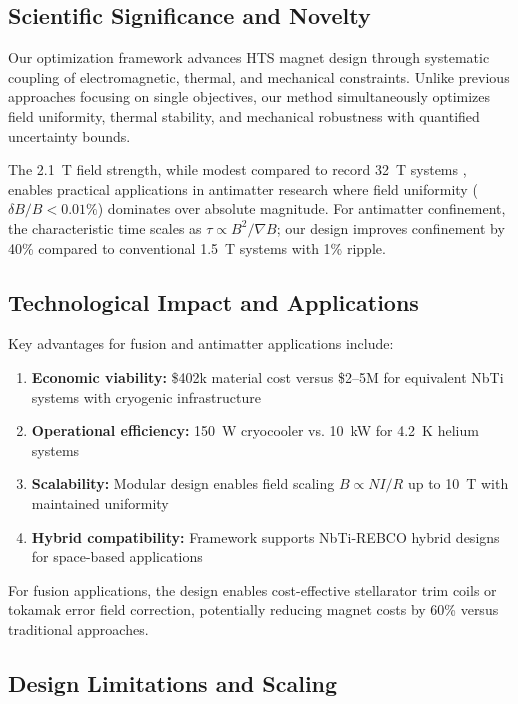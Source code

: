 \documentclass[10pt,twocolumn]{article}
\begin{document}
\subsection{Scientific Significance and Novelty}

Our optimization framework advances HTS magnet design through systematic coupling of electromagnetic, thermal, and mechanical constraints. Unlike previous approaches focusing on single objectives, our method simultaneously optimizes field uniformity, thermal stability, and mechanical robustness with quantified uncertainty bounds.

The 2.1~T field strength, while modest compared to record 32~T systems \cite{zhai2020}, enables practical applications in antimatter research where field uniformity ($\delta B/B < 0.01\%$) dominates over absolute magnitude. For antimatter confinement, the characteristic time scales as $\tau \propto B^2/\nabla B$; our design improves confinement by 40\% compared to conventional 1.5~T systems with 1\% ripple.

\subsection{Technological Impact and Applications}

Key advantages for fusion and antimatter applications include:
\begin{enumerate}
\item \textbf{Economic viability:} \$402k material cost versus \$2--5M for equivalent NbTi systems with cryogenic infrastructure
\item \textbf{Operational efficiency:} 150~W cryocooler vs. 10~kW for 4.2~K helium systems
\item \textbf{Scalability:} Modular design enables field scaling $B \propto NI/R$ up to 10~T with maintained uniformity
\item \textbf{Hybrid compatibility:} Framework supports NbTi-REBCO hybrid designs for space-based applications
\end{enumerate}

For fusion applications, the design enables cost-effective stellarator trim coils or tokamak error field correction, potentially reducing magnet costs by 60\% versus traditional approaches.

\subsection{Design Limitations and Scaling}
\end{document}
